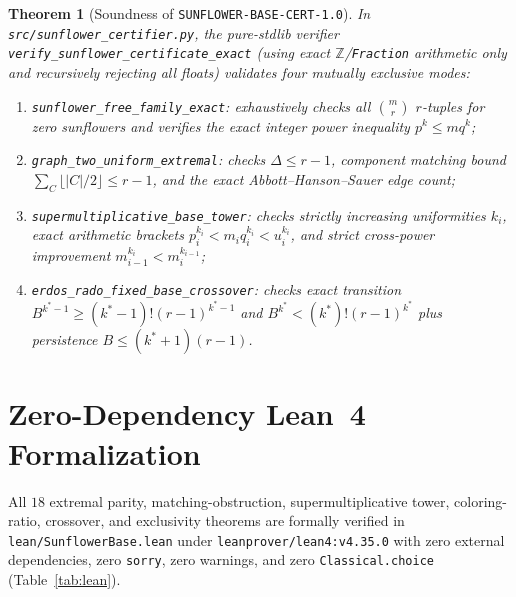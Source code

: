 \documentclass[11pt,a4paper]{article}
\newtheorem{theorem}{Theorem}[section]
\theoremstyle{definition}
\theoremstyle{remark}
\newcommand{\ZZ}{\mathbb{Z}}
\newcommand{\certschema}{\texttt{SUNFLOWER-BASE-CERT-1.0}}
\begin{document}
\begin{theorem}[Soundness of \certschema{}]\label{thm:verifier}
In \texttt{src/sunflower\_certifier.py}, the pure-stdlib verifier
\texttt{verify\_sunflower\_certificate\_exact} (using exact $\ZZ$/\texttt{Fraction} arithmetic only and recursively rejecting all floats) validates four mutually exclusive modes:
\begin{enumerate}[leftmargin=1.8em,itemsep=1pt]
  \item \texttt{sunflower\_free\_family\_exact}: exhaustively checks all $\binom{m}{r}$ $r$-tuples for zero sunflowers and verifies the exact integer power inequality $p^k \le m q^k$;
  \item \texttt{graph\_two\_uniform\_extremal}: checks $\Delta \le r-1$, component matching bound $\sum_C \lfloor |C|/2 \rfloor \le r-1$, and the exact Abbott--Hanson--Sauer edge count;
  \item \texttt{supermultiplicative\_base\_tower}: checks strictly increasing uniformities $k_i$, exact arithmetic brackets $p_i^{k_i} < m_i q_i^{k_i} < u_i^{k_i}$, and strict cross-power improvement $m_{i-1}^{k_i} < m_i^{k_{i-1}}$;
  \item \texttt{erdos\_rado\_fixed\_base\_crossover}: checks exact transition $B^{k^*-1} \ge (k^*-1)!(r-1)^{k^*-1}$ and $B^{k^*} < (k^*)!(r-1)^{k^*}$ plus persistence $B \le (k^*+1)(r-1)$.
\end{enumerate}
\end{theorem}

\section{Zero-Dependency Lean~4 Formalization}\label{sec:lean}

All $18$ extremal parity, matching-obstruction, supermultiplicative tower, coloring-ratio, crossover, and exclusivity theorems are formally verified in \texttt{lean/SunflowerBase.lean} under \texttt{leanprover/lean4:v4.35.0} with zero external dependencies, zero \texttt{sorry}, zero warnings, and zero \texttt{Classical.choice} (Table~\ref{tab:lean}).
\end{document}
